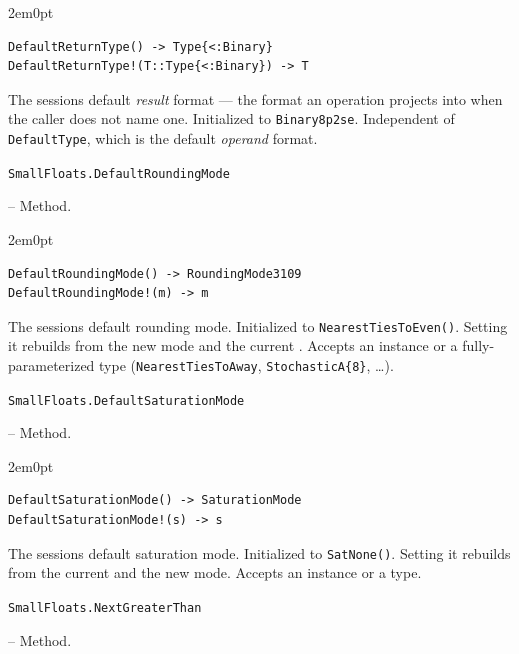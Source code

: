 \begin{adjustwidth}{2em}{0pt}


\begin{verbatim}
DefaultReturnType() -> Type{<:Binary}
DefaultReturnType!(T::Type{<:Binary}) -> T
\end{verbatim}

The session{\textquotesingle}s default \emph{result} format — the format an operation projects into when the caller does not name one. Initialized to \texttt{Binary8p2se}. Independent of \texttt{DefaultType}, which is the default \emph{operand} format.



\end{adjustwidth}
\hypertarget{790339220741924172}{\texttt{SmallFloats.DefaultRoundingMode}}  -- {Method.}

\begin{adjustwidth}{2em}{0pt}


\begin{verbatim}
DefaultRoundingMode() -> RoundingMode3109
DefaultRoundingMode!(m) -> m
\end{verbatim}

The session{\textquotesingle}s default rounding mode. Initialized to \texttt{NearestTiesToEven()}. Setting it rebuilds  from the new mode and the current . Accepts an instance or a fully-parameterized type (\texttt{NearestTiesToAway}, \texttt{StochasticA\{8\}}, …).



\end{adjustwidth}
\hypertarget{11118232298850481653}{\texttt{SmallFloats.DefaultSaturationMode}}  -- {Method.}

\begin{adjustwidth}{2em}{0pt}


\begin{verbatim}
DefaultSaturationMode() -> SaturationMode
DefaultSaturationMode!(s) -> s
\end{verbatim}

The session{\textquotesingle}s default saturation mode. Initialized to \texttt{SatNone()}. Setting it rebuilds  from the current  and the new mode. Accepts an instance or a type.



\end{adjustwidth}
\hypertarget{4425608605544763458}{\texttt{SmallFloats.NextGreaterThan}}  -- {Method.}

